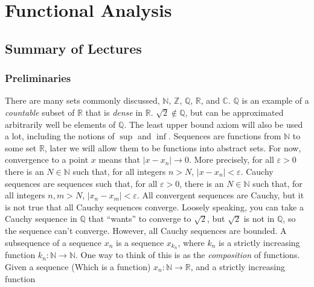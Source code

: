 \documentclass[crop=false,class=article,oneside]{standalone}
\begin{document}
    \ifx\ifmathcoursesfunctional\undefined
        \section*{Functional Analysis}
        \setcounter{section}{1}
    \fi
    \subsection{Summary of Lectures}
        \subsubsection{Preliminaries}
            There are many sets commonly discussed,
            $\mathbb{N}$, $\mathbb{Z}$, $\mathbb{Q}$,
            $\mathbb{R}$, and $\mathbb{C}$.
            $\mathbb{Q}$ is an example of a
            \textit{countable} subset of $\mathbb{R}$ that is
            \textit{dense} in $\mathbb{R}$.
            $\sqrt{2}\notin\mathbb{Q}$, but can be approximated
            arbitrarily well be elements of $\mathbb{Q}$.
            The least upper bound axiom will also be used a lot,
            including the notions of $\sup$ and $\inf$. Sequences
            are functions from $\mathbb{N}$ to some set
            $\mathbb{R}$, later we will allow them to be functions
            into abstract sets. For now, convergence to a point $x$
            means that $|x-x_{n}|\rightarrow{0}$. More precisely,
            for all $\varepsilon>0$ there is an $N\in\mathbb{N}$
            such that, for all integers $n>N$,
            $|x-x_{n}|<\varepsilon$. Cauchy sequences are
            sequences such that, for all $\varepsilon>0$, there
            is an $N\in\mathbb{N}$ such that, for all integers
            $n,m>N$, $|x_{n}-x_{m}|<\varepsilon$. All convergent
            sequences are Cauchy, but it is not true that all
            Cauchy sequences converge. Loosely speaking, you can
            take a Cauchy sequence in $\mathbb{Q}$ that ``wants''
            to converge to $\sqrt{2}$, but $\sqrt{2}$ is not
            in $\mathbb{Q}$, so the sequence can't converge.
            However, all Cauchy sequences are bounded. A
            subsequence of a sequence $x_{n}$ is a sequence
            $x_{k_{n}}$, where $k_{n}$ is a strictly increasing
            function $k_{n}:\mathbb{N}\rightarrow\mathbb{N}$. One
            way to think of this is as the \textit{composition}
            of functions. Given a sequence (Which is a function)
            $x_{n}:\mathbb{N}\rightarrow\mathbb{R}$, and a
            strictly increasing function
\end{document}

